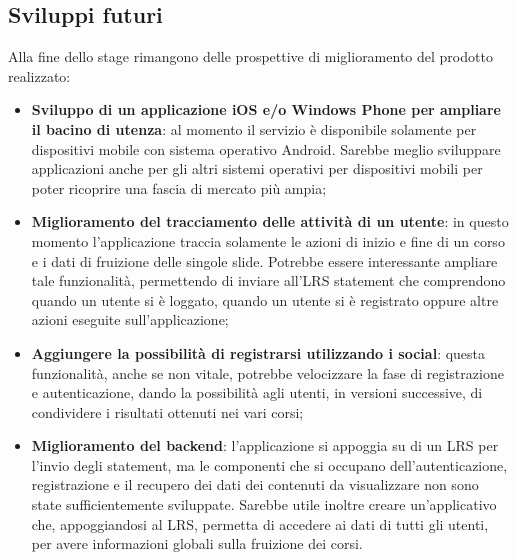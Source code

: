 \documentclass[../Tesi.tex]{subfiles}
\begin{document}
	\subsection{Sviluppi futuri}
	Alla fine dello stage rimangono delle prospettive di miglioramento del prodotto realizzato:
	\begin{itemize}
		\item \textbf{Sviluppo di un applicazione iOS e/o Windows Phone per ampliare il bacino di utenza}: al momento il servizio è disponibile solamente per dispositivi mobile con sistema operativo Android. Sarebbe meglio sviluppare applicazioni anche per gli altri sistemi operativi per dispositivi mobili per poter ricoprire una fascia di mercato più ampia;
		\item \textbf{Miglioramento del tracciamento delle attività di un utente}: in questo momento l'applicazione traccia solamente le azioni di inizio e fine di un corso e i dati di fruizione delle singole slide. Potrebbe essere interessante ampliare tale funzionalità, permettendo di inviare all'LRS statement che comprendono quando un utente si è loggato, quando un utente si è registrato oppure altre azioni eseguite sull'applicazione;
		\item \textbf{Aggiungere la possibilità di registrarsi utilizzando i social}: questa funzionalità, anche se non vitale, potrebbe velocizzare la fase di registrazione e autenticazione, dando la possibilità agli utenti, in versioni successive, di condividere i risultati ottenuti nei vari corsi;
		\item \textbf{Miglioramento del backend}: l'applicazione si appoggia su di un LRS per l'invio degli statement, ma le componenti che si occupano dell'autenticazione, registrazione e il recupero dei dati dei contenuti da visualizzare non sono state sufficientemente sviluppate. Sarebbe utile inoltre creare un'applicativo che, appoggiandosi al LRS, permetta di accedere ai dati di tutti gli utenti, per avere informazioni globali sulla fruizione dei corsi.
	\end{itemize}
\end{document}
